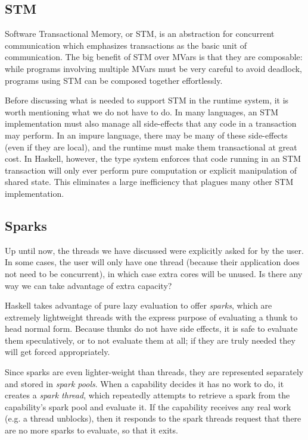 \subsection{STM}

Software Transactional Memory, or STM, is an abstraction for concurrent
communication which emphasizes transactions as the basic unit of
communication.  The big benefit of STM over MVars is that they are
composable: while programs involving multiple MVars must be very careful
to avoid deadlock, programs using STM can be composed together
effortlessly.

Before discussing what is needed to support STM in the runtime system,
it is worth mentioning what we do not have to do.  In many languages,
an STM implementation must also manage all side-effects that any code
in a transaction may perform.  In an impure language, there may be many
of these side-effects (even if they are local), and the runtime must
make them transactional at great cost.  In Haskell, however, the type system
enforces that code running in an STM transaction will only ever perform
pure computation or explicit manipulation of shared state.  This eliminates
a large inefficiency that plagues many other STM implementation.


\subsection{Sparks}

Up until now, the threads we have discussed were explicitly asked for
by the user.  In some cases, the user will only have one thread (because
their application does not need to be concurrent), in which case extra
cores will be unused.  Is there any way we can take advantage of extra
capacity?

Haskell takes advantage of pure lazy evaluation to offer \emph{sparks},
which are extremely lightweight threads with the express purpose of
evaluating a thunk to head normal form.  Because thunks do not have
side effects, it is safe to evaluate them speculatively, or to not
evaluate them at all; if they are truly needed they will get forced
appropriately.

Since sparks are even lighter-weight than threads, they are represented
separately and stored in \emph{spark pools}.  When a capability decides
it has no work to do, it creates a \emph{spark thread}, which repeatedly
attempts to retrieve a spark from the capability's spark pool and
evaluate it.  If the capability receives any real work (e.g. a thread
unblocks), then it responds to the spark threads request that there are no
more sparks to evaluate, so that it exits.

